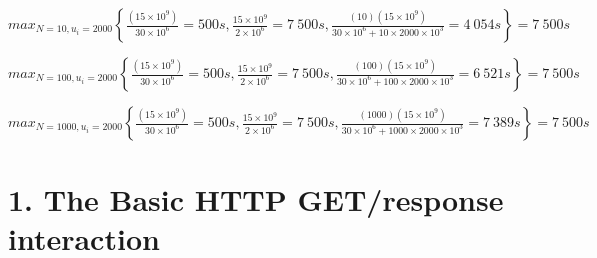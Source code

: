 \documentclass{article}
\begin{document}
\begin{enumerate}
\hspace*{8mm}$max_{N=10, u_i=2000}\left\{ \frac{(15\times 10^9)}{30\times 10^6}=500s,\frac{15\times 10^9}{2\times 10^6}=7\ 500s, \frac{(10)(15\times 10^9)}{30\times 10^6+10\times 2000\times 10^3}=4\ 054s\right\}=7\ 500s$\par
\hspace*{6.5mm}$max_{N=100, u_i=2000}\left\{ \frac{(15\times 10^9)}{30\times 10^6}=500s,\frac{15\times 10^9}{2\times 10^6}=7\ 500s, \frac{(100)(15\times 10^9)}{30\times 10^6+100\times 2000\times 10^3}=6\ 521s\right\}=7\ 500s$\par
\hspace*{5mm}$max_{N=1000, u_i=2000}\left\{ \frac{(15\times 10^9)}{30\times 10^6}=500s,\frac{15\times 10^9}{2\times 10^6}=7\ 500s, \frac{(1000)(15\times 10^9)}{30\times 10^6+1000\times 2000\times 10^3}=7\ 389s\right\}=7\ 500s$\par

\end{enumerate}
\newpage
\section*{1. The Basic HTTP GET/response interaction}
\end{document}
